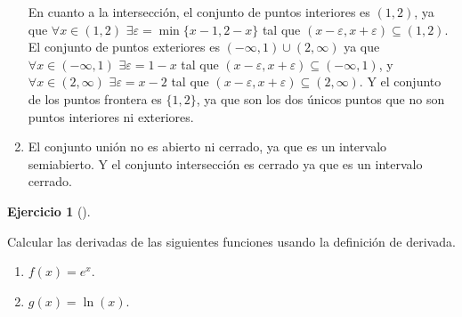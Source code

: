 \documentclass[
  spanish,
  a4paper,
]{scrreport}
\providecommand{\tightlist}{%
  \setlength{\itemsep}{0pt}\setlength{\parskip}{0pt}}
\theoremstyle{definition}
\newtheorem{exercise}{Ejercicio}[chapter]
\theoremstyle{remark}
\begin{document}
\begin{tcolorbox}
\begin{enumerate}
  En cuanto a la intersección, el conjunto de puntos interiores es
  \((1,2)\), ya que \(\forall x\in(1,2)\)
  \(\exists \varepsilon=\min\{x-1,2-x\}\) tal que
  \((x-\varepsilon, x+\varepsilon)\subseteq (1,2)\). El conjunto de
  puntos exteriores es \((-\infty,1)\cup(2,\infty)\) ya que
  \(\forall x\in (-\infty, 1)\) \(\exists \varepsilon = 1-x\) tal que
  \((x-\varepsilon,x+\varepsilon)\subseteq (-\infty, 1)\), y
  \(\forall x\in (2,\infty)\) \(\exists \varepsilon = x-2\) tal que
  \((x-\varepsilon,x+\varepsilon)\subseteq (2,\infty)\). Y el conjunto
  de los puntos frontera es \(\{1,2\}\), ya que son los dos únicos
  puntos que no son puntos interiores ni exteriores.
\item
  El conjunto unión no es abierto ni cerrado, ya que es un intervalo
  semiabierto. Y el conjunto intersección es cerrado ya que es un
  intervalo cerrado.
\end{enumerate}

\end{tcolorbox}

\begin{exercise}[]\protect\hypertarget{exr-2}{}\label{exr-2}

Calcular las derivadas de las siguientes funciones usando la definición
de derivada.

\begin{enumerate}
\def\labelenumi{\alph{enumi}.}
\tightlist
\item
  \(f(x)=e^x\).
\item
  \(g(x)=\ln(x)\).
\end{enumerate}

\end{exercise}
\end{document}
